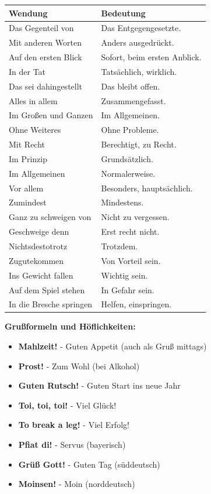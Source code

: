 \bigskip
\begin{center}
\begin{tabular}{|l|p{8cm}|}
\hline
Wendung & Bedeutung \\ \hline
Das Gegenteil von & Das Entgegengesetzte. \\ \hline
Mit anderen Worten & Anders ausgedrückt. \\ \hline
Auf den ersten Blick & Sofort, beim ersten Anblick. \\ \hline
In der Tat & Tatsächlich, wirklich. \\ \hline
Das sei dahingestellt & Das bleibt offen. \\ \hline
Alles in allem & Zusammengefasst. \\ \hline
Im Großen und Ganzen & Im Allgemeinen. \\ \hline
Ohne Weiteres & Ohne Probleme. \\ \hline
Mit Recht & Berechtigt, zu Recht. \\ \hline
Im Prinzip & Grundsätzlich. \\ \hline
Im Allgemeinen & Normalerweise. \\ \hline
Vor allem & Besonders, hauptsächlich. \\ \hline
Zumindest & Mindestens. \\ \hline
Ganz zu schweigen von & Nicht zu vergessen. \\ \hline
Geschweige denn & Erst recht nicht. \\ \hline
Nichtsdestotrotz & Trotzdem. \\ \hline
Zugutekommen & Von Vorteil sein. \\ \hline
Ins Gewicht fallen & Wichtig sein. \\ \hline
Auf dem Spiel stehen & In Gefahr sein. \\ \hline
In die Bresche springen & Helfen, einspringen. \\ \hline
\end{tabular}
\end{center}

\bigskip
\noindent\textbf{Grußformeln und Höflichkeiten:}

\begin{itemize}
    \item \textbf{Mahlzeit!} - Guten Appetit (auch als Gruß mittags)
    \item \textbf{Prost!} - Zum Wohl (bei Alkohol)
    \item \textbf{Guten Rutsch!} - Guten Start ins neue Jahr
    \item \textbf{Toi, toi, toi!} - Viel Glück!
    \item \textbf{To break a leg!} - Viel Erfolg!
    \item \textbf{Pfiat di!} - Servus (bayerisch)
    \item \textbf{Grüß Gott!} - Guten Tag (süddeutsch)
    \item \textbf{Moinsen!} - Moin (norddeutsch)
\end{itemize}


